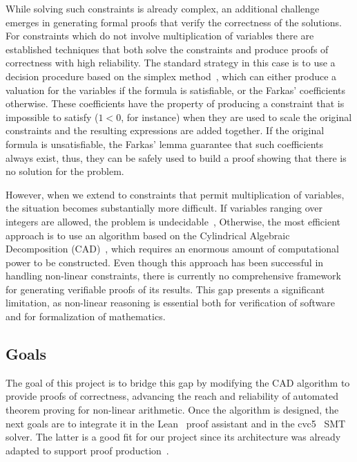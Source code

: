 \documentclass[a4paper, 12pt]{article}
\begin{document}
%
While solving such constraints is already complex, an additional challenge emerges in generating
formal proofs that verify the correctness of the solutions.
%
For constraints which do not involve multiplication of variables there are established techniques
that both solve the constraints and produce proofs of correctness with high reliability.
%
The standard strategy in this case is to use a decision procedure based on the simplex method~\cite{simplex_dpllt}, which can either produce a valuation for the variables if the formula
is satisfiable, or the Farkas' coefficients~\cite{farkas_ref} otherwise.
%
These coefficients have the property of producing a constraint that is impossible to satisfy
($1 < 0$, for instance) when they are used to scale the original constraints and the resulting
expressions are added together.
%
If the original formula is unsatisfiable, the Farkas' lemma guarantee that such coefficients always
exist, thus, they can be safely used to build a proof showing that there is no solution for the problem.

However, when we extend to constraints that permit multiplication of variables,
the situation becomes substantially more difficult.
If variables ranging over integers are allowed, the problem is undecidable~\cite{integerUndec},
Otherwise, the most efficient approach is to use an algorithm based on the Cylindrical
Algebraic Decomposition (CAD)~\cite{col75},
which requires an enormous amount of computational power to be constructed. Even though
this approach has been successful in handling non-linear constraints, there is currently
no comprehensive framework for generating verifiable proofs of its results. This gap presents
a significant limitation, as non-linear reasoning is essential both for verification of
software and for formalization of mathematics.

\subsection{Goals}

The goal of this project is to bridge this gap by modifying the CAD algorithm to provide
proofs of correctness, advancing the reach and reliability of automated theorem proving
for non-linear arithmetic. Once the algorithm is designed, the next goals
are to integrate it in the Lean~\cite{lean4} proof assistant and in the cvc5~\cite{cvc5} SMT solver.
The latter is a good fit for our project since its architecture was already adapted to support proof production~\cite{flexibleProofs}.
\end{document}
